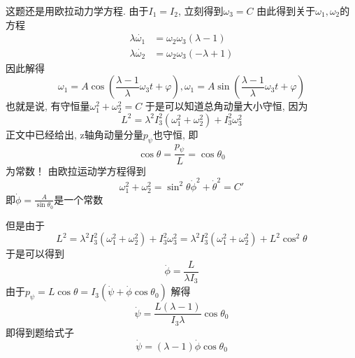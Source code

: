 \begin{solution}
    这题还是用欧拉动力学方程. 
    由于$I_1=I_2$, 立刻得到$\omega_3=C$
    由此得到关于$\omega_1,\omega_2$的方程
    \begin{align*}
        \lambda\dot{\omega_1}&=\omega_2\omega_3(\lambda-1)\\
        \lambda\dot{\omega_2}&=\omega_2\omega_3(-\lambda+1)
    \end{align*}
    因此解得
    $$\omega_1=A\cos(\frac{\lambda-1}{\lambda}\omega_3 t+\varphi),\omega_1=A\sin(\frac{\lambda-1}{\lambda}\omega_3 t+\varphi)$$
    也就是说, 有守恒量$\omega_1^2+\omega_2^2=C$
    于是可以知道总角动量大小守恒, 因为
    $$L^2=\lambda^2 I_3^2(\omega_1^2+\omega_2^2)+I_3^2\omega_3^2$$
    正文中已经给出, z轴角动量分量$p_\psi$也守恒, 即
    $$\cos\theta=\frac{p_\psi}{L}=\cos\theta_0$$
    为常数！
    由欧拉运动学方程得到
    $$\omega_1^2+\omega_2^2=\sin^2\theta\dot\phi^2+\dot\theta^2=C'$$
    即$\dot\phi=\frac{A}{\sin\theta_0}$是一个常数
    
    但是由于$$L^2=\lambda^2I_3^2(\omega_1^2+\omega_2^2)+I_3^2\omega_3^2=\lambda^2 I_3^2(\omega_1^2+\omega_2^2)+L^2\cos^2\theta$$
    于是可以得到
    $$\dot\phi=\frac{L}{\lambda I_3}$$
    由于$p_\psi=L\cos\theta=I_3(\dot\psi+\dot\phi\cos\theta_0)$
    解得
    $$\dot\psi=\frac{L(\lambda-1)}{I_3\lambda}\cos\theta_0$$
    即得到题给式子
    $$\dot\psi=(\lambda-1)\dot\phi\cos\theta_0$$
\end{solution}

